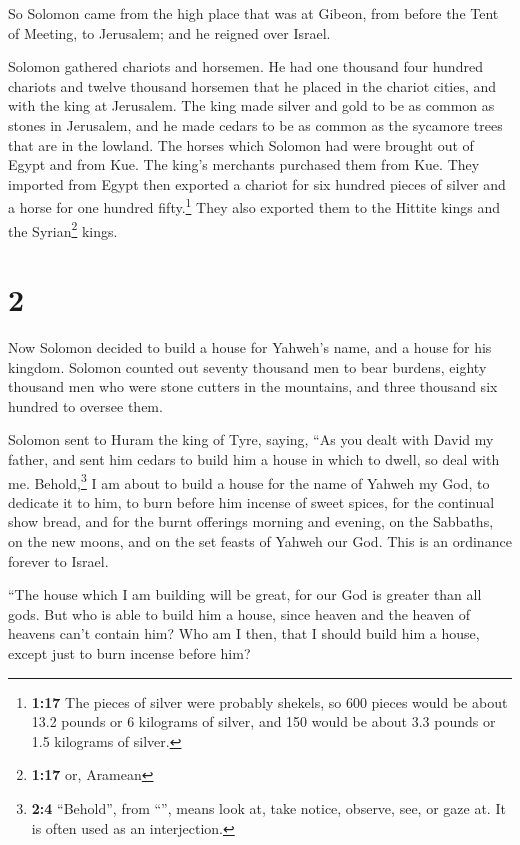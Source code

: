  So Solomon came from the high place that was at Gibeon,
from before the Tent of Meeting, to Jerusalem; and he reigned over
Israel.

 Solomon gathered chariots and horsemen. He had one
thousand four hundred chariots and twelve thousand horsemen that he
placed in the chariot cities, and with the king at Jerusalem.
 The king made silver and gold to be as common as stones
in Jerusalem, and he made cedars to be as common as the sycamore trees
that are in the lowland.  The horses which Solomon had
were brought out of Egypt and from Kue. The king's merchants purchased
them from Kue.  They imported from Egypt then exported a
chariot for six hundred pieces of silver and a horse for one hundred
fifty.\footnote{\textbf{1:17} The pieces of silver were probably
  shekels, so 600 pieces would be about 13.2 pounds or 6 kilograms of
  silver, and 150 would be about 3.3 pounds or 1.5 kilograms of silver.}
They also exported them to the Hittite kings and the Syrian\footnote{\textbf{1:17}
  or, Aramean} kings.

\hypertarget{section-1}{%
\section{2}\label{section-1}}

 Now Solomon decided to build a house for Yahweh's name,
and a house for his kingdom.  Solomon counted out seventy
thousand men to bear burdens, eighty thousand men who were stone cutters
in the mountains, and three thousand six hundred to oversee them.

 Solomon sent to Huram the king of Tyre, saying, ``As you
dealt with David my father, and sent him cedars to build him a house in
which to dwell, so deal with me.  Behold,\footnote{\textbf{2:4}
  ``Behold'', from ``'', means look at, take notice,
  observe, see, or gaze at. It is often used as an interjection.} I am
about to build a house for the name of Yahweh my God, to dedicate it to
him, to burn before him incense of sweet spices, for the continual show
bread, and for the burnt offerings morning and evening, on the Sabbaths,
on the new moons, and on the set feasts of Yahweh our God. This is an
ordinance forever to Israel.

 ``The house which I am building will be great, for our
God is greater than all gods.  But who is able to build
him a house, since heaven and the heaven of heavens can't contain him?
Who am I then, that I should build him a house, except just to burn
incense before him?

